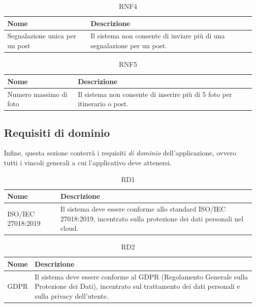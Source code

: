 \documentclass{natourDoc}
\begin{document}
	\begin{table}[H]
		\centering
		\begin{tabular}{ |p{5cm}|p{10.3cm}| } 
			\hline
			\rowcolor{PineGreen!70}
			\textbf{Nome} & \textbf{Descrizione} \\
			\hline
			Segnalazione unica per un post & Il sistema non consente di inviare più di una segnalazione per un post. \\
			\hline
		\end{tabular}
		\caption{RNF4}
		\label{table:24}
	\end{table}

	\begin{table}[H]
		\centering
		\begin{tabular}{ |p{5cm}|p{10.3cm}| } 
			\hline
			\rowcolor{PineGreen!70}
			\textbf{Nome} & \textbf{Descrizione} \\
			\hline
			Numero massimo di foto & Il sistema non consente di inserire più di 5 foto per itinerario o post. \\
			\hline
		\end{tabular}
		\caption{RNF5}
		\label{table:25}
	\end{table}

	\newpage

	\subsection{Requisiti di dominio}
	Infine, questa sezione conterrà i requisiti \textit{di dominio} dell'applicazione, ovvero tutti i vincoli generali a cui l'applicativo
	deve attenersi. \\

	\begin{table}[H]
		\centering
		\begin{tabular}{ |p{5cm}|p{10.3cm}| }
			\hline
			\rowcolor{PineGreen!70}
			\textbf{Nome} & \textbf{Descrizione} \\
			\hline
			ISO/IEC 27018:2019 & Il sistema deve essere conforme allo standard ISO/IEC 27018:2019, 
			incentrato sulla protezione dei dati personali nel cloud. \\
			\hline
		\end{tabular}
		\caption{RD1}
		\label{table:26}
	\end{table}

	\begin{table}[H]
		\centering
		\begin{tabular}{ |p{5cm}|p{10.3cm}| }
			\hline
			\rowcolor{PineGreen!70}
			\textbf{Nome} & \textbf{Descrizione} \\
			\hline
			GDPR & Il sistema deve essere conforme al GDPR (Regolamento Generale sulla Protezione dei Dati), 
			incentrato sul trattamento dei dati personali e sulla privacy dell’utente.  \\
			\hline
		\end{tabular}
		\caption{RD2}
		\label{table:27}
	\end{table}
\end{document}
